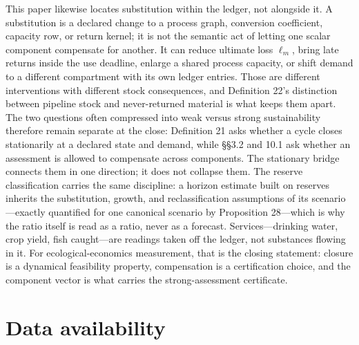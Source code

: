 \documentclass[11pt]{article}
\begin{document}
This paper likewise locates substitution within the ledger, not alongside it. A substitution is a declared change to a process graph, conversion coefficient, capacity row, or return kernel; it is not the semantic act of letting one scalar component compensate for another. It can reduce ultimate loss \(\ell_m\), bring late returns inside the use deadline, enlarge a shared process capacity, or shift demand to a different compartment with its own ledger entries. Those are different interventions with different stock consequences, and Definition 22's distinction between pipeline stock and never-returned material is what keeps them apart. The two questions often compressed into weak versus strong sustainability therefore remain separate at the close: Definition 21 asks whether a cycle closes stationarily at a declared state and demand, while \S\S3.2 and 10.1 ask whether an assessment is allowed to compensate across components. The stationary bridge connects them in one direction; it does not collapse them. The reserve classification carries the same discipline: a horizon estimate built on reserves inherits the substitution, growth, and reclassification assumptions of its scenario---exactly quantified for one canonical scenario by Proposition 28---which is why the ratio itself is read as a ratio, never as a forecast. Services---drinking water, crop yield, fish caught---are readings taken off the ledger, not substances flowing in it. For ecological-economics measurement, that is the closing statement: closure is a dynamical feasibility property, compensation is a certification choice, and the component vector is what carries the strong-assessment certificate.

\vspace{0.8em}

\section*{Data availability}\label{data-availability}
\end{document}

